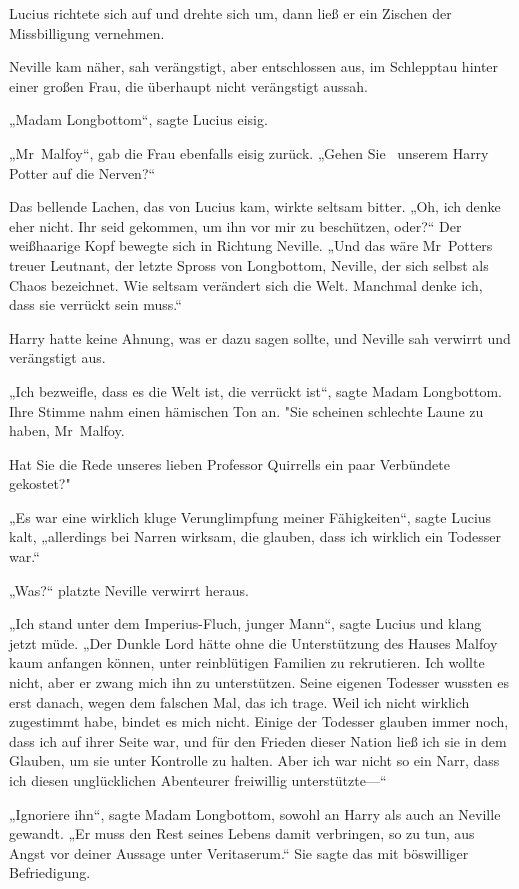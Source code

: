 {Lucius richtete sich auf und drehte sich um, dann ließ er ein Zischen der Missbilligung vernehmen.

Neville kam näher, sah verängstigt, aber entschlossen aus, im Schlepptau hinter einer großen Frau, die überhaupt nicht verängstigt aussah.

„Madam Longbottom“, sagte Lucius eisig.

„Mr~Malfoy“, gab die Frau ebenfalls eisig zurück. „Gehen Sie ~unserem Harry Potter auf die Nerven?“

Das bellende Lachen, das von Lucius kam, wirkte seltsam bitter. „Oh, ich denke eher nicht. Ihr seid gekommen, um ihn vor mir zu beschützen, oder?“ Der weißhaarige Kopf bewegte sich in Richtung Neville. „Und das wäre Mr~Potters treuer Leutnant, der letzte Spross von Longbottom, Neville, der sich selbst als Chaos bezeichnet. Wie seltsam verändert sich die Welt. Manchmal denke ich, dass sie verrückt sein muss.“

Harry hatte keine Ahnung, was er dazu sagen sollte, und Neville sah verwirrt und verängstigt aus.

„Ich bezweifle, dass es die Welt ist, die verrückt ist“, sagte Madam Longbottom. Ihre Stimme nahm einen hämischen Ton an. "Sie scheinen schlechte Laune zu haben, Mr~Malfoy.

Hat Sie die Rede unseres lieben Professor Quirrells ein paar Verbündete gekostet?"

„Es war eine wirklich kluge Verunglimpfung meiner Fähigkeiten“, sagte Lucius kalt, „allerdings bei Narren wirksam, die glauben, dass ich wirklich ein Todesser war.“

„Was?“ platzte Neville verwirrt heraus.

„Ich stand unter dem Imperius-Fluch, junger Mann“, sagte Lucius und klang jetzt müde. „Der Dunkle Lord hätte ohne die Unterstützung des Hauses Malfoy kaum anfangen können, unter reinblütigen Familien zu rekrutieren. Ich wollte nicht, aber er zwang mich ihn zu unterstützen. Seine eigenen Todesser wussten es erst danach, wegen dem falschen Mal, das ich trage. Weil ich nicht wirklich zugestimmt habe, bindet es mich nicht. Einige der Todesser glauben immer noch, dass ich auf ihrer Seite war, und für den Frieden dieser Nation ließ ich sie in dem Glauben, um sie unter Kontrolle zu halten. Aber ich war nicht so ein Narr, dass ich diesen unglücklichen Abenteurer freiwillig unterstützte—“

„Ignoriere ihn“, sagte Madam Longbottom, sowohl an Harry als auch an Neville gewandt. „Er muss den Rest seines Lebens damit verbringen, so zu tun, aus Angst vor deiner Aussage unter Veritaserum.“ Sie sagte das mit böswilliger Befriedigung.

}
